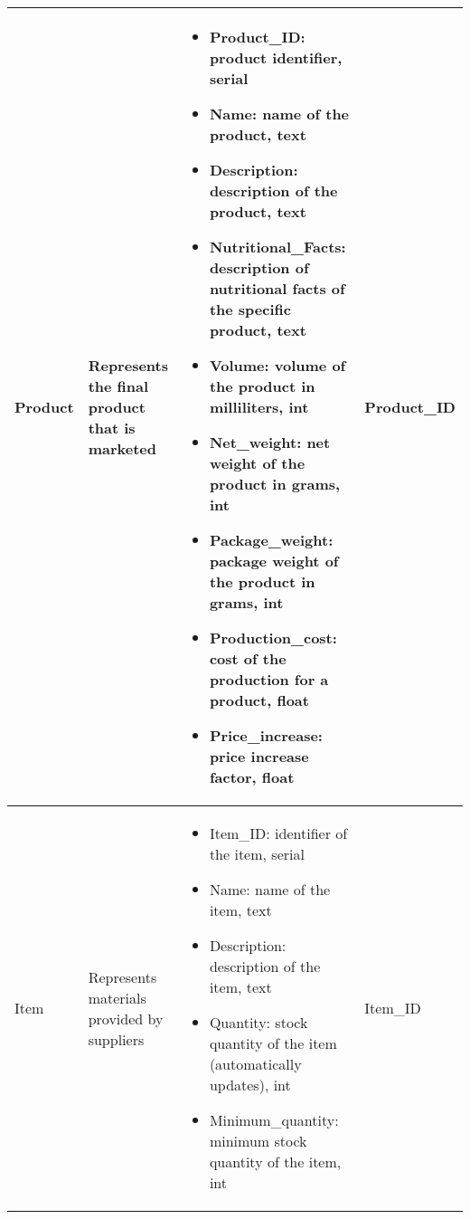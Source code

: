 \begin{longtable}{|p{}|p{} |p{}|p{} |}
    Product & Represents the final product that is marketed &
    \begin{itemize}
        \vspace{-1em}
        \item Product\_ID:   product identifier, serial
        \item Name:   name of the product, text
        \item Description:   description of the product, text
        \item Nutritional\_Facts: description of nutritional facts of the specific product, text
        \item Volume:   volume of the product in milliliters, int
        \item Net\_weight:   net weight of the product in grams, int
        \item Package\_weight:   package weight of the product in grams, int
        \item Production\_cost:   cost of the production for a product, float
        \item Price\_increase:   price increase factor, float                         %
    \end{itemize}
    &  Product\_ID \\\hline

    Item & Represents materials provided by suppliers &
    \begin{itemize}
        \vspace{-1em}
        \item Item\_ID:   identifier of the item, serial
        \item Name:   name of the item, text
        \item Description:   description of the item, text
        \item Quantity:   stock quantity of the item (automatically updates), int
        \item Minimum\_quantity:   minimum stock quantity of the item, int
    \end{itemize}
    &  Item\_ID \\\hline


\end{longtable}

